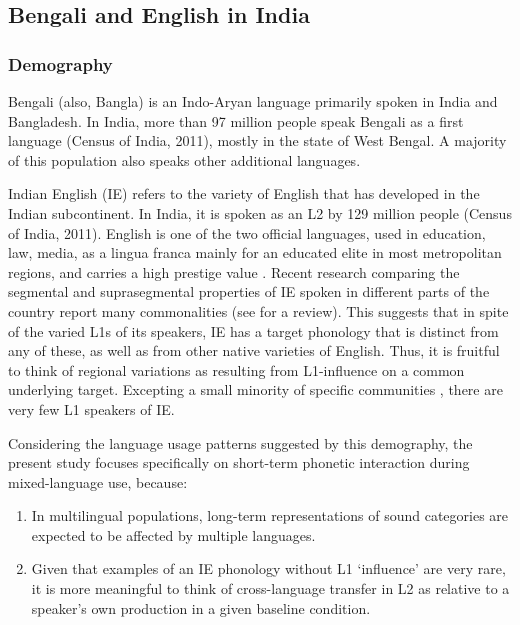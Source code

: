 \documentclass[12 pt]{article}
\begin{document}
\subsection{Bengali and English in India} \label{bengali_english_in_india}

\subsubsection*{Demography} 

Bengali (also, Bangla) is an Indo-Aryan language primarily spoken in India and Bangladesh. In India, more than 97 million people speak Bengali as a first language (Census of India, 2011), mostly in the state of West Bengal. A majority of this population also speaks other additional languages.

Indian English (IE) refers to the variety of English that has developed in the Indian subcontinent. In India, it is spoken as an L2 by 129 million people (Census of India, 2011).  English is one of the two official languages, used in education, law, media, as a lingua franca mainly for an educated elite in most metropolitan regions, and carries a high prestige value \citep{pandey201517, kachru1981english, tollefson2014language, kachru1983indianization}.
Recent research comparing the segmental and suprasegmental properties of IE spoken in different parts of the country report many commonalities (see \cite{sirsa2013effects} for a review). This suggests that in spite of the varied L1s of its speakers, IE has a target phonology that is distinct from any of these, as well as from other native varieties of English. Thus, it is fruitful to think of regional variations as resulting from L1-influence on a common underlying target. Excepting a small minority of specific communities \citep{pandey201517, wells1982accents, coelho1997anglo}, there are very few L1 speakers of IE.

Considering the language usage patterns suggested by this demography, the present study focuses specifically on short-term phonetic interaction during mixed-language use, because:

\begin{enumerate}[label=(\roman*)]
	\item In multilingual populations, long-term representations of sound categories are expected to be affected by multiple languages. 
	\item Given that examples of an IE phonology without L1 `influence' are very rare, it is more meaningful to think of cross-language transfer in L2 as relative to a speaker's own production in a given baseline condition.
\end{enumerate}
\end{document}
